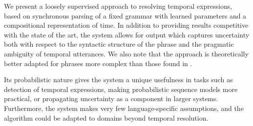 We present a loosely supervised approach to resolving temporal expressions,
	based on synchronous parsing of a fixed grammar with learned parameters
	and a compositional representation of time.
In addition to providing results competitive with the state of the art,
	the system allows for output which captures uncertainty both with respect to 
	the syntactic structure of the phrase and the pragmatic ambiguity of 
	temporal utterances.
We also note that the approach is theoretically better adapted for
	phrases more complex than those found in \tempeval.

Its probabilistic nature gives the system a unique usefulness
	in tasks such as detection of temporal expressions, making probabilistic
	sequence models more practical, or propagating uncertainty as a
	component in larger systems.
Furthermore, the system makes very few language-specific assumptions,
	and the algorithm could be adapted to domains beyond temporal resolution.
